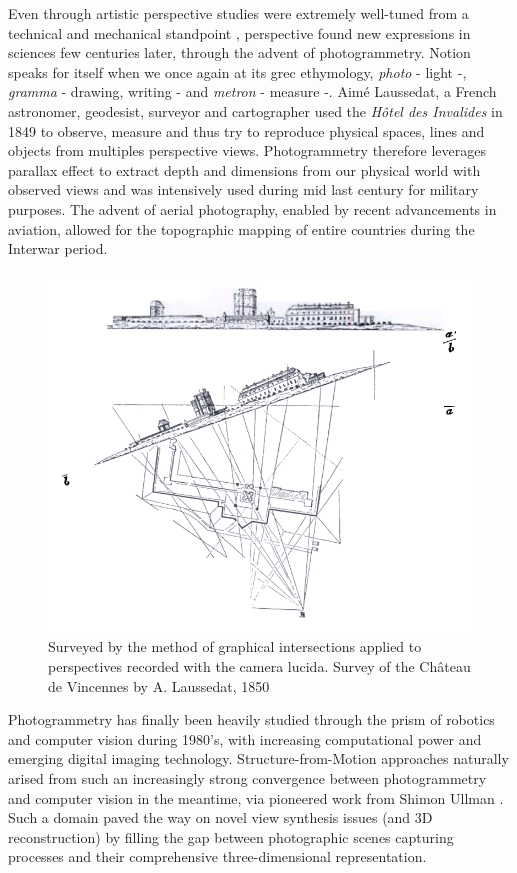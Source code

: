 Even through artistic perspective studies were extremely well-tuned from a technical and mechanical standpoint \citep{simon2021jan}, perspective found new expressions in sciences few centuries later, through the advent of photogrammetry. Notion speaks for itself when we once again at its grec ethymology, \textit{photo} - \ie light -, \textit{gramma} - \ie drawing, writing - and \textit{metron} - \ie measure -. Aimé Laussedat, a French astronomer, geodesist, surveyor and cartographer used the \textit{Hôtel des Invalides} in 1849 to observe, measure and thus try to reproduce physical spaces, lines and objects from multiples perspective views. Photogrammetry therefore leverages parallax effect to extract depth and dimensions from our physical world with observed views and was intensively used during mid last century for military purposes. The advent of aerial photography, enabled by recent advancements in aviation, allowed for the topographic mapping of entire countries during the Interwar period.

\begin{figure}[h!]
      \begin{center}
      \includegraphics[width=.5\textwidth]{images/introduction/laussedat_phtograpmetrie.png}
      \end{center}
      \caption{Surveyed by the method of graphical intersections applied to perspectives recorded with the camera lucida. Survey of the Château de Vincennes by A. Laussedat, 1850}
      \label{fig:intro_laussedat}
\end{figure}

Photogrammetry has finally been heavily studied through the prism of robotics and computer vision during 1980's, with increasing computational power and emerging digital imaging technology. Structure-from-Motion approaches naturally arised from such an increasingly strong convergence between photogrammetry and computer vision in the meantime, via pioneered work from Shimon Ullman \citep{ullman1979interpretation}. Such a domain paved the way on novel view synthesis issues (and 3D reconstruction) by filling the gap between photographic scenes capturing processes and their comprehensive three-dimensional representation. 

